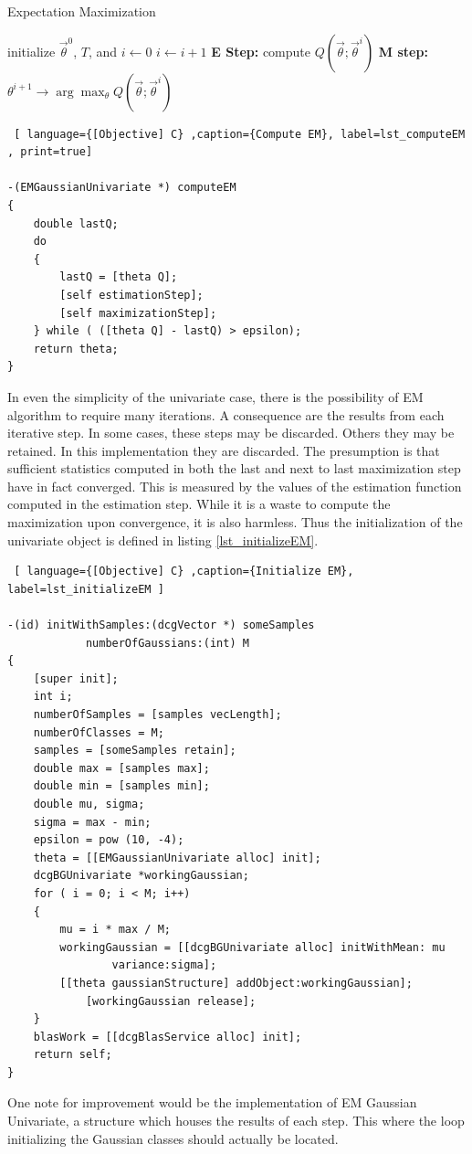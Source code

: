 \documentclass[12pt]{report}
\begin{document}
\begin{algorithm}
\caption{Expectation Maximization}
\label{alg:expectation-maximization}
\begin{algorithmic}
	\STATE initialize $\vec{\theta}^0$, $T$, and $i \leftarrow 0$
	\REPEAT
		\STATE $i \leftarrow i + 1$
		\STATE \textbf{E Step:} compute $Q(\vec{\theta} ; \vec{\theta}^i)$ 
		\STATE \textbf{M step:} $\theta ^{i+1} \rightarrow \arg \max _{\theta} Q(\vec{\theta} ; \vec{\theta} ^i)$ 
\end{algorithmic}
\end{algorithm}

\begin{lstlisting} [ language={[Objective] C} ,caption={Compute EM}, label=lst_computeEM , print=true] 

-(EMGaussianUnivariate *) computeEM
{
	double lastQ;
	do 
	{
		lastQ = [theta Q];
		[self estimationStep];
		[self maximizationStep];
	} while ( ([theta Q] - lastQ) > epsilon);
	return theta;
}
\end{lstlisting}

In even the simplicity of the univariate case, there is the possibility of EM algorithm to require many iterations.  A consequence are the results from each iterative step.  In some cases, these steps may be discarded.  Others they may be retained.  In this implementation  they are discarded.  The presumption is that sufficient statistics computed in both the last and next to last maximization step have in fact converged.  This is measured by the values of the estimation function computed in the estimation step.  While it is a waste to compute the maximization upon convergence, it is also harmless.  Thus the initialization of the univariate object is defined in listing \ref{lst_initializeEM}.

\begin{lstlisting} [ language={[Objective] C} ,caption={Initialize EM}, label=lst_initializeEM ] 

-(id) initWithSamples:(dcgVector *) someSamples
			numberOfGaussians:(int) M
{
	[super init];
	int i;
	numberOfSamples = [samples vecLength];
	numberOfClasses = M;
	samples = [someSamples retain];
	double max = [samples max];
	double min = [samples min];
	double mu, sigma;
	sigma = max - min;
	epsilon = pow (10, -4);
	theta = [[EMGaussianUnivariate alloc] init]; 
	dcgBGUnivariate *workingGaussian;
	for ( i = 0; i < M; i++)
	{
		mu = i * max / M;
		workingGaussian = [[dcgBGUnivariate alloc] initWithMean: mu
				variance:sigma];
		[[theta gaussianStructure] addObject:workingGaussian];
			[workingGaussian release];
	}
	blasWork = [[dcgBlasService alloc] init];
	return self;
}
\end{lstlisting}
One note for improvement would be the implementation of EM Gaussian Univariate, a structure which houses the results of each step.  This where the loop initializing the Gaussian classes should actually be located.
\end{document}
